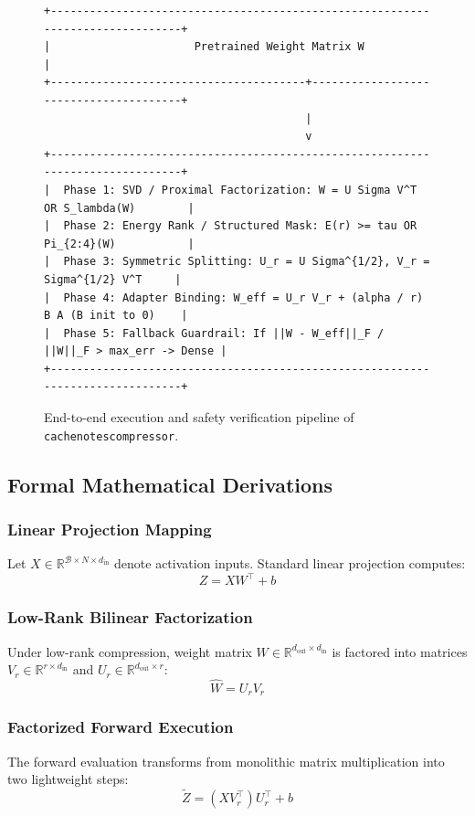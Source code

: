 \begin{figure}[t]
\centering
\begin{verbatim}
+-------------------------------------------------------------------------------+
|                      Pretrained Weight Matrix W                               |
+---------------------------------------+---------------------------------------+
                                        |
                                        v
+-------------------------------------------------------------------------------+
|  Phase 1: SVD / Proximal Factorization: W = U Sigma V^T OR S_lambda(W)        |
|  Phase 2: Energy Rank / Structured Mask: E(r) >= tau OR Pi_{2:4}(W)           |
|  Phase 3: Symmetric Splitting: U_r = U Sigma^{1/2}, V_r = Sigma^{1/2} V^T     |
|  Phase 4: Adapter Binding: W_eff = U_r V_r + (alpha / r) B A (B init to 0)    |
|  Phase 5: Fallback Guardrail: If ||W - W_eff||_F / ||W||_F > max_err -> Dense |
+-------------------------------------------------------------------------------+
\end{verbatim}
\caption{End-to-end execution and safety verification pipeline of \texttt{cachenotescompressor}.}
\end{figure}

\subsection{Formal Mathematical Derivations}

\subsubsection{Linear Projection Mapping}
Let $X \in \mathbb{R}^{\mathcal{B} \times N \times d_{\text{in}}}$ denote activation inputs. Standard linear projection computes:
\[
Z = X W^\top + b
\]

\subsubsection{Low-Rank Bilinear Factorization}
Under low-rank compression, weight matrix $W \in \mathbb{R}^{d_{\text{out}} \times d_{\text{in}}}$ is factored into matrices $V_r \in \mathbb{R}^{r \times d_{\text{in}}}$ and $U_r \in \mathbb{R}^{d_{\text{out}} \times r}$:
\[
\hat{W} = U_r V_r
\]

\subsubsection{Factorized Forward Execution}
The forward evaluation transforms from monolithic matrix multiplication into two lightweight steps:
\[
\tilde{Z} = (X V_r^\top) U_r^\top + b
\]

